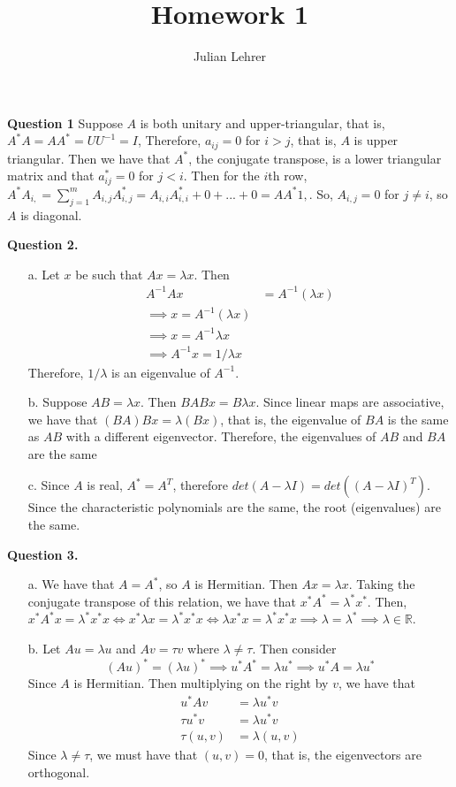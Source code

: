 \documentclass{article}
\title{Homework 1}
\date{}
\author{Julian Lehrer}
\newcommand{\R}{\mathbb{R}}
\begin{document}
\maketitle
\textbf{Question 1}
Suppose $A$ is both unitary and upper-triangular, that is,
$A^*A=AA^*=UU^{-1}=I$, Therefore, $a_{ij} = 0$ for $i > j$, that is, $A$ is upper triangular. Then we have that $A^*$, the conjugate transpose, is a lower triangular matrix and that $a^*_{ij} = 0$ for $j < i$. Then for the $i$th row, $A^*A_{i, } = \sum_{j=1}^m A_{i, j}A^*_{i, j}=A_{i, i}A^{*}_{i, i }+ 0+...+0 = AA^*{1, }$. So, $A_{i,j}=0$ for $j \neq i$, so $A$ is diagonal. 

\textbf{Question 2.} 
\begin{itemize}
    \item[a.] Let $x$ be such that $Ax =\lambda x$. Then 
    \begin{align*}
        A^{-1}Ax &= A^{-1}\left(\lambda x\right) \\ 
        \implies x = A^{-1}\left(\lambda x\right)\\
        \implies x=A^{-1}\lambda x \\
        \implies A^{-1}x = 1/\lambda x
    \end{align*}
    Therefore, $1/\lambda$ is an eigenvalue of $A^{-1}$. 
    \item[b.] Suppose $AB = \lambda x$. Then $BAB x= B\lambda x$. Since linear maps are associative, we have that $(BA)Bx = \lambda(Bx)$, that is, the eigenvalue of $BA$ is the same as $AB$ with a different eigenvector. Therefore, the eigenvalues of $AB$ and $BA$ are the same 
    \item[c.] Since $A$ is real, $A^* = A^T$, therefore $det(A-\lambda I) = det((A-\lambda I)^T)$. Since the characteristic polynomials are the same, the root (eigenvalues) are the same. 
\end{itemize}

\textbf{Question 3.} 
\begin{itemize}
    \item[a.] We have that $A = A^*$, so $A$ is Hermitian. Then $Ax = \lambda x$. Taking the conjugate transpose of this relation, we have that $x^*A^* = \lambda^*x^*$. Then, $x^*A^*x = \lambda^*x^* x \iff x^*\lambda x = \lambda^*x^*x \iff \lambda x^*x = \lambda^* x^*x \implies \lambda = \lambda^* \implies \lambda \in \R$. 
    \item[b.] Let $Au = \lambda u$ and $Av = \tau v$ where $\lambda \neq \tau$. Then consider 
    \begin{equation*}
        (Au)^* = (\lambda u)^* \implies u^*A^* = \lambda u^* \implies u^*A = \lambda u^*
    \end{equation*}
    Since $A$ is Hermitian. Then multiplying on the right by $v$, we have that 
    \begin{align*}
        u^*Av &= \lambda u^*v \\
        \tau u^*v &= \lambda u^* v\\
        \tau (u, v) &= \lambda (u, v)
    \end{align*} 
    Since $\lambda \neq \tau$, we must have that $(u,v)=0$, that is, the eigenvectors are orthogonal. 
\end{itemize}
\end{document}
